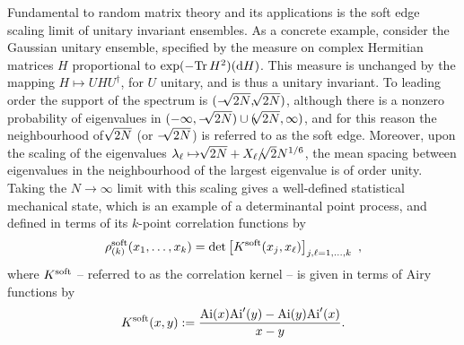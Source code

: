 \documentclass[10pt,reqno]{amsart}
\theoremstyle{plain}
\theoremstyle{definition}
\theoremstyle{remark}
\begin{document}
Fundamental to random matrix theory and its applications is the soft edge scaling limit of unitary invariant ensembles.
As a concrete example, consider the Gaussian unitary ensemble, specified by the measure on complex Hermitian matrices
$H $ proportional to $\exp(-\mbox{Tr}\,H^2)({\rm d} { H})$. This measure is unchanged by the mapping 
${ H} \mapsto U  H U^{\dagger}$, for $U$ unitary, and is thus a unitary invariant. To leading order the support 
of the spectrum is $(-{ \hspace{-0.5pt} \sqrt[]{{2N}}},{ \hspace{-0.5pt} \sqrt[]{{2N}}})$, although there is a nonzero probability of eigenvalues in 
$(-\infty, -{ \hspace{-0.5pt} \sqrt[]{{2N}}}) \cup ({ \hspace{-0.5pt} \sqrt[]{{2N}}},\infty)$, and for this reason the neighbourhood of ${ \hspace{-0.5pt} \sqrt[]{{2N}}}$ (or $-{ \hspace{-0.5pt} \sqrt[]{{2N}}}$)
is referred to as the soft edge. Moreover, upon the scaling of the eigenvalues $\lambda_{\ell} \mapsto { \hspace{-0.5pt} \sqrt[]{{2N}}} + X_{\ell}/{ \hspace{-0.5pt} \sqrt[]{{2}}}N^{1/6}$, 
the mean spacing between eigenvalues in the neighbourhood of the largest eigenvalue is of order unity. Taking the $N \rightarrow \infty$ limit 
with this scaling gives a well-defined statistical mechanical state, which is an example of a determinantal point process, and defined in terms of its
$k$-point correlation functions by 
\begin{align}
\rho_{(k)}^{\rm soft}(x_1,\ldots,x_k) = \det \left[ K^{\rm soft} (x_j,x_{\ell}) \right]_{j,\ell = 1,\ldots,k} \ ,  
\label{eq:2f}
\end{align}
where $K^{\rm soft}$ -- referred to as the correlation kernel -- is given in terms of Airy functions by
\begin{align}
K^{\rm soft}(x,y):= \frac{ {\rm Ai}(x) {\rm Ai}^{\prime}(y) - {\rm Ai}(y) {\rm Ai}^{\prime}(x)   } {x-y} .    
\label{eq:2fa}
\end{align}
\end{document}
